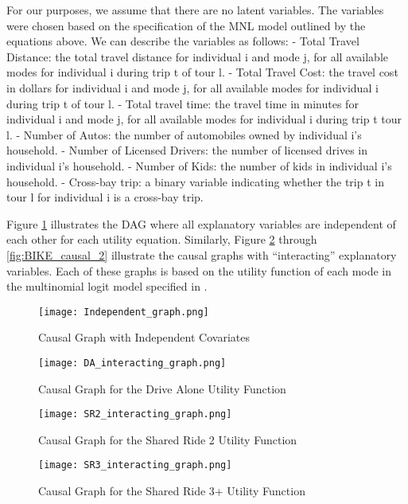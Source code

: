 For our purposes, we assume that there are no latent variables.
The variables were chosen based on the specification of the MNL model outlined by the equations above.
We can describe the variables as follows:
- Total Travel Distance: the total travel distance for individual i and mode j, for all available modes for individual i during trip t of tour l.
- Total Travel Cost: the travel cost in dollars for individual i and mode j, for all available modes for individual i during trip t of tour l.
- Total travel time: the travel time in minutes for individual i and mode j, for all available modes for individual i during trip t tour l.
- Number of Autos: the number of automobiles owned by individual i's household.
- Number of Licensed Drivers: the number of licensed drives in individual i's household.
- Number of Kids: the number of kids in individual i's household.
- Cross-bay trip: a binary variable indicating whether the trip t in tour l for individual i is a cross-bay trip.

Figure \ref{fig:IND_GRAPH} illustrates the DAG where all explanatory variables are independent of each other for each utility equation.
Similarly, Figure \ref{fig:DA_causal_2} through \ref{fig:BIKE_causal_2} illustrate the causal graphs with ``interacting'' explanatory variables.
Each of these graphs is based on the utility function of each mode in the multinomial logit model specified in \citet{brathwaite_asymmetric}.

\begin{figure}
   \centering
   \texttt{[image: Independent\_graph.png]}
   \caption{Causal Graph with Independent Covariates}
   \label{fig:IND_GRAPH}
\end{figure}

\begin{figure}
   \centering
   \texttt{[image: DA\_interacting\_graph.png]}
   \caption{Causal Graph for the Drive Alone Utility Function}
   \label{fig:DA_causal_2}
\end{figure}

\begin{figure}
   \centering
   \texttt{[image: SR2\_interacting\_graph.png]}
   \caption{Causal Graph for the Shared Ride 2 Utility Function}
   \label{fig:SR2_causal_2}
\end{figure}

\begin{figure}
   \centering
   \texttt{[image: SR3\_interacting\_graph.png]}
   \caption{Causal Graph for the Shared Ride 3+ Utility Function}
   \label{fig:SR3_causal_2}
\end{figure}

